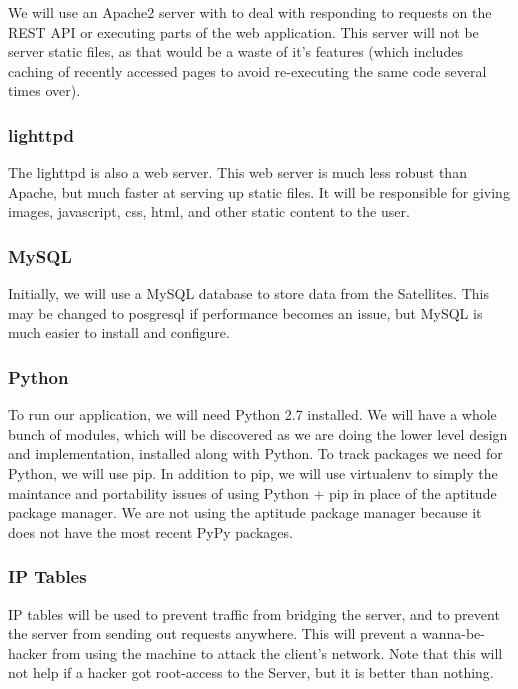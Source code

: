We will use an Apache2 server with  to deal with responding to requests on the \ac{REST} \ac{API} or executing parts of the web application.
This server will not be server static files, as that would be a waste of it's features (which includes caching of recently accessed pages to avoid re-executing the same code several times over).

\subsubsection{lighttpd}

The lighttpd is also a web server.
This web server is much less robust than Apache, but much faster at serving up static files.
It will be responsible for giving images, javascript, css, html, and other static content to the user.

\subsubsection{MySQL}

Initially, we will use a MySQL database to store data from the Satellites.
This may be changed to posgresql if performance becomes an issue, but MySQL is much easier to install and configure.

\subsubsection{Python}

To run our application, we will need Python 2.7 installed.
We will have a whole bunch of modules, which will be discovered as we are doing the lower level design and implementation, installed along with Python.
To track packages we need for Python, we will use pip.
In addition to pip, we will use virtualenv to simply the maintance and portability issues of using Python + pip in place of the aptitude package manager.
We are not using the aptitude package manager because it does not have the most recent PyPy packages.

\subsubsection{\ac{IP} Tables}

\ac{IP} tables will be used to prevent traffic from bridging the server, and to prevent the server from sending out requests anywhere.
This will prevent a wanna-be-hacker from using the machine to attack the client's network.
Note that this will not help if a hacker got root-access to the Server, but it is better than nothing.

